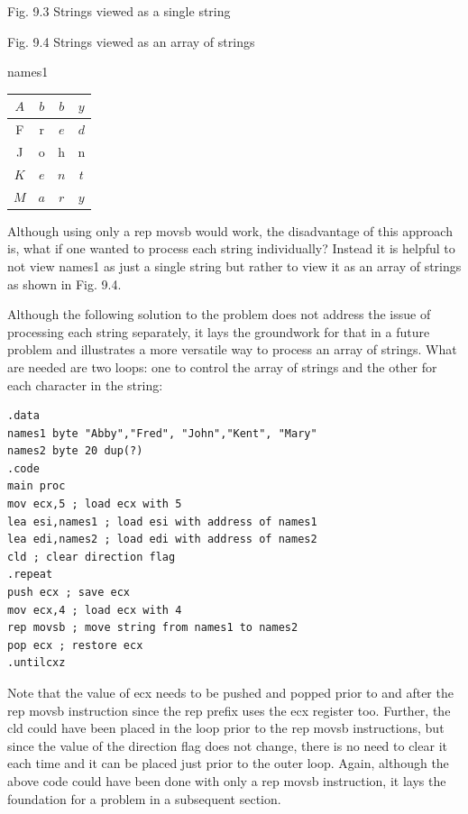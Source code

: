 \documentclass[10pt]{book}
\begin{document}
Fig. 9.3 Strings viewed as a single string


Fig. 9.4 Strings viewed as an array of strings

names1 \begin{tabular}{|c|c|c|c|}
\hline
$A$ & $b$ & $b$ & $y$ \\
\hline
F & r & $e$ & $d$ \\
\hline
J & o & h & n \\
\hline
$K$ & $e$ & $n$ & $t$ \\
\hline
$M$ & $a$ & $r$ & $y$ \\
\hline
\end{tabular}

Although using only a rep movsb would work, the disadvantage of this approach is, what if one wanted to process each string individually? Instead it is helpful to not view names1 as just a single string but rather to view it as an array of strings as shown in Fig. 9.4.

Although the following solution to the problem does not address the issue of processing each string separately, it lays the groundwork for that in a future problem and illustrates a more versatile way to process an array of strings. What are needed are two loops: one to control the array of strings and the other for each character in the string:

\begin{verbatim}
.data
names1 byte "Abby","Fred", "John","Kent", "Mary"
names2 byte 20 dup(?)
.code
main proc
mov ecx,5 ; load ecx with 5
lea esi,names1 ; load esi with address of names1
lea edi,names2 ; load edi with address of names2
cld ; clear direction flag
.repeat
push ecx ; save ecx
mov ecx,4 ; load ecx with 4
rep movsb ; move string from names1 to names2
pop ecx ; restore ecx
.untilcxz
\end{verbatim}

Note that the value of ecx needs to be pushed and popped prior to and after the rep movsb instruction since the rep prefix uses the ecx register too. Further, the cld could have been placed in the loop prior to the rep movsb instructions, but since the value of the direction flag does not change, there is no need to clear it each time and it can be placed just prior to the outer loop. Again, although the above code could have been done with only a rep movsb instruction, it lays the foundation for a problem in a subsequent section.
\end{document}
